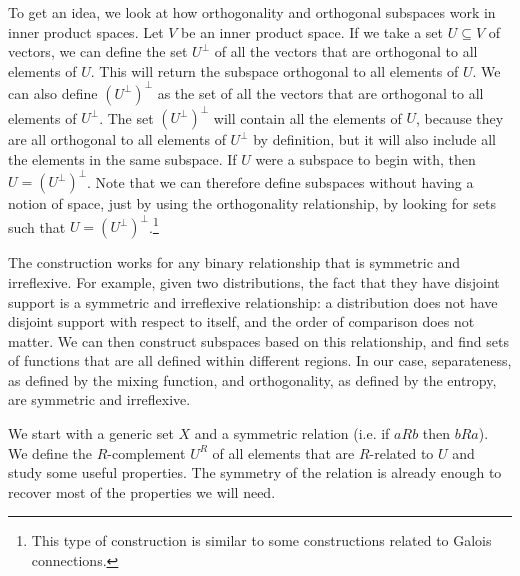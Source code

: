 To get an idea, we look at how orthogonality and orthogonal subspaces work in inner product spaces. Let $V$ be an inner product space. If we take a set $U \subseteq V$ of vectors, we can define the set $U^{\perp}$ of all the vectors that are orthogonal to all elements of $U$. This will return the subspace orthogonal to all elements of $U$. We can also define $(U^{\perp})^{\perp}$ as the set of all the vectors that are orthogonal to all elements of $U^{\perp}$. The set $(U^{\perp})^{\perp}$ will contain all the elements of $U$, because they are all orthogonal to all elements of $U^{\perp}$ by definition, but it will also include all the elements in the same subspace. If $U$ were a subspace to begin with, then $U = (U^{\perp})^{\perp}$. Note that we can therefore define subspaces without having a notion of space, just by using the orthogonality relationship, by looking for sets such that $U = (U^{\perp})^{\perp}$.\footnote{This type of construction is similar to some constructions related to Galois connections.}

The construction works for any binary relationship that is symmetric and irreflexive. For example, given two distributions, the fact that they have disjoint support is a symmetric and irreflexive relationship: a distribution does not have disjoint support with respect to itself, and the order of comparison does not matter. We can then construct subspaces based on this relationship, and find sets of functions that are all defined within different regions. In our case, separateness, as defined by the mixing function, and orthogonality, as defined by the entropy, are symmetric and irreflexive.

We start with a generic set $X$ and a symmetric relation (i.e. if $aRb$ then $bRa$). We define the $R$-complement $U^R$ of all elements that are $R$-related to $U$ and study some useful properties. The symmetry of the relation is already enough to recover most of the properties we will need.

